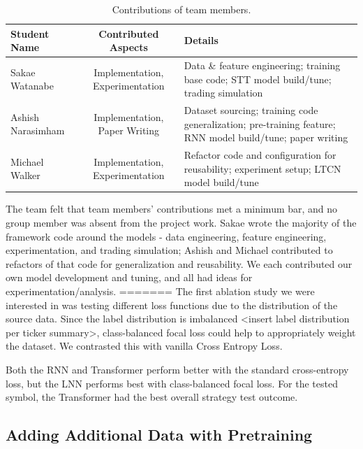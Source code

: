 \documentclass[10pt,twocolumn,letterpaper]{article}
\begin{document}
\begin{table}
    \begin{center}
\begin{tabular}{|l|c|p{8cm}|}
\hline
Student Name & Contributed Aspects & Details \\
\hline
Sakae Watanabe & Implementation, Experimentation & Data \& feature engineering; training base code; STT model build/tune; trading simulation\\
\hline
Ashish Narasimham & Implementation, Paper Writing & Dataset sourcing; training code generalization; pre-training feature; RNN model build/tune; paper writing \\
\hline
Michael Walker & Implementation, Experimentation & Refactor code and configuration for reusability; experiment setup; LTCN model build/tune \\
\hline
\end{tabular}
    \end{center}
\caption{Contributions of team members.}
\label{tab:contributions}
\end{table}

The team felt that team members’ contributions met a minimum bar, and no group member was absent from the project work. Sakae wrote the majority of the framework code around the models - data engineering, feature engineering, experimentation, and trading simulation; Ashish and Michael contributed to refactors of that code for generalization and reusability. We each contributed our own model development and tuning, and all had ideas for experimentation/analysis.
=======
The first ablation study we were interested in was testing different loss functions due to the distribution of the source data. Since the label distribution is imbalanced <insert label distribution per ticker summary>, class-balanced focal loss could help to appropriately weight the dataset. We contrasted this with vanilla Cross Entropy Loss.


Both the RNN and Transformer perform better with the standard cross-entropy loss, but the LNN performs best with class-balanced focal loss. For the tested symbol, the Transformer had the best overall strategy test outcome.

\subsection{Adding Additional Data with Pretraining}
\end{document}
